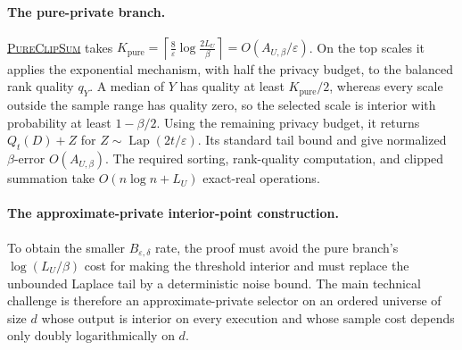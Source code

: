 \documentclass[11pt]{article}
\begin{document}
\paragraph{The pure-private branch.}
\hyperref[alg:pure-clip-sum]{\textsc{PureClipSum}} takes
$K_{\mathrm{pure}}
 =\left\lceil\frac8\varepsilon\log\frac{2L_U}{\beta}\right\rceil
 =O(A_{U,\beta}/\varepsilon)$.
On the top scales it applies the exponential mechanism, with half the
privacy budget, to the balanced rank quality $q_Y$.  A median of $Y$ has
quality at least $K_{\mathrm{pure}}/2$, whereas every scale outside the
sample range has quality zero, so the selected scale is interior with
probability at least $1-\beta/2$.  Using the remaining privacy budget, it
returns $Q_t(D)+Z$ for
$Z\sim\operatorname{Lap}(2t/\varepsilon)$.  Its standard tail bound and
 give normalized $\beta$-error
$O(A_{U,\beta})$.  The required sorting, rank-quality computation, and
clipped summation take $O(n\log n+L_U)$ exact-real operations.

\paragraph{The approximate-private interior-point construction.}
To obtain the smaller $B_{\varepsilon,\delta}$ rate, the proof must avoid the
pure branch's $\log(L_U/\beta)$ cost for making the threshold interior and
must replace the unbounded Laplace tail by a deterministic noise bound.  The
main technical challenge is therefore an approximate-private selector on an
ordered universe of size $d$ whose output is interior on every execution and
whose sample cost depends only doubly logarithmically on $d$.
\end{document}
